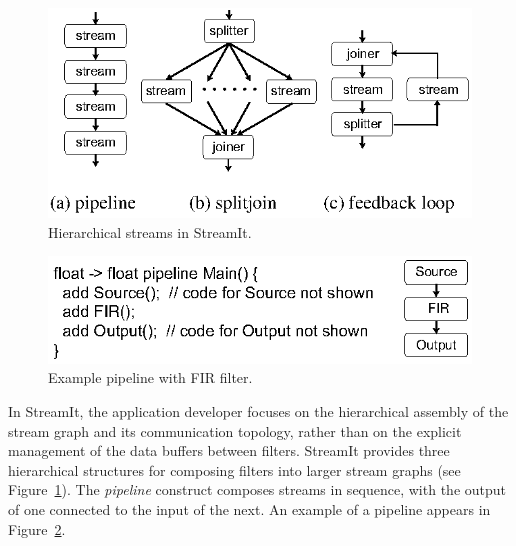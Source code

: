 \begin{figure}[t]
\begin{center}
 \includegraphics[scale=1, angle=0]{./constructs-eg.eps}
 \caption{Hierarchical streams in StreamIt.}
 \label{fig:containers}
\end{center}
\end{figure}

\begin{figure}[t]
\begin{center}
\vspace{-12pt}
 \includegraphics[scale=1, angle=0]{./pipeline-eg.eps}
 \caption{Example pipeline with FIR filter.}
 \label{fig:pipeline}
\end{center}
\end{figure}

In StreamIt, the
application developer focuses on the hierarchical assembly of the
stream graph and its communication topology, rather than on the 
explicit management of the data buffers between filters.
StreamIt provides three hierarchical structures for composing filters
into larger stream graphs (see Figure~\ref{fig:containers}). The 
{\it pipeline} construct composes streams in sequence, with the output
of one connected to the input of the next.   An example of a pipeline
appears in Figure~\ref{fig:pipeline}.

